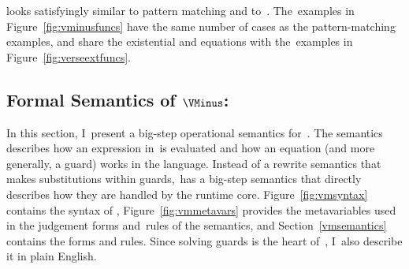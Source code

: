 \documentclass[manuscript,screen 12pt, nonacm]{acmart}
\begin{document}
    \VMinus looks satisfyingly similar to pattern matching and to~\VC.
    The~\VMinus examples in Figure~\ref{fig:vminusfuncs} have the same number of
    cases as the pattern-matching examples, and share the existential and
    equations with the~\VC examples in Figure~\ref{fig:verseextfuncs}. 
   





\subsection{Formal Semantics of $\VMinus$:}
    In this section, I~present a big-step operational semantics for~\VMinus. The
    semantics describes how an expression in~\VMinus is evaluated and how an
    equation (and more generally, a guard) works in the language. Instead of a
    rewrite semantics that makes substitutions within guards,~\VMinus has a
    big-step semantics that directly describes how they are handled by the
    runtime core. Figure~\ref{fig:vmsyntax} contains the syntax of \VMinus,
    Figure~\ref{fig:vmmetavars} provides the metavariables used in the judgement
    forms and~rules of the semantics, and Section~\ref{vmsemantics} contains the
    forms and rules. Since solving guards is the heart of~\VMinus, I~also
    describe it in plain English.
\end{document}
